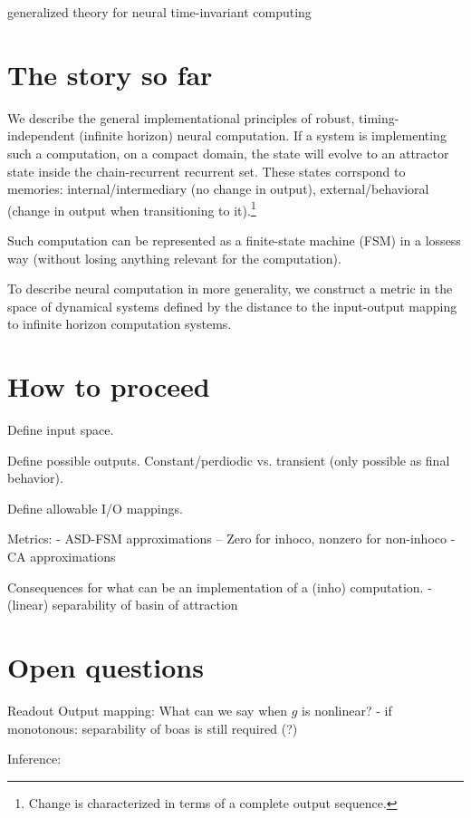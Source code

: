 \documentclass{scrartcl}
\theoremstyle{definition}
\theoremstyle{remark}
\begin{document}
generalized theory for neural time-invariant computing \citep{jaeger2021,jaeger2023theory}




\newpage
\section*{The story so far}
We describe the general implementational principles of robust, timing-independent (infinite horizon) neural computation.
If a system is implementing such a computation, on a compact domain, the state will evolve to an attractor state inside the chain-recurrent recurrent set.
These states corrspond to memories: internal/intermediary (no change in output), external/behavioral (change in output when transitioning to it).\footnote{Change is characterized in terms of a complete output sequence.}

Such computation can be represented as a finite-state machine (FSM) in a lossess way (without losing anything relevant for the computation).

To describe neural computation in more generality, we construct a metric in the space of dynamical systems defined by the distance to the input-output mapping to infinite horizon computation systems.


\section*{How to proceed}

Define input space.

Define possible outputs. Constant/perdiodic vs. transient (only possible as final behavior).

Define allowable I/O mappings.


Metrics:
- ASD-FSM approximations
-- Zero for inhoco, nonzero for non-inhoco
- CA approximations 


Consequences for what can be an implementation of a (inho) computation.
- (linear) separability of basin of attraction




\section*{Open questions}

Readout \citep{myers2022}
Output mapping: What can we say when $g$ is nonlinear?
- if monotonous: separability of boas is still required (?)


Inference: 
\end{document}
